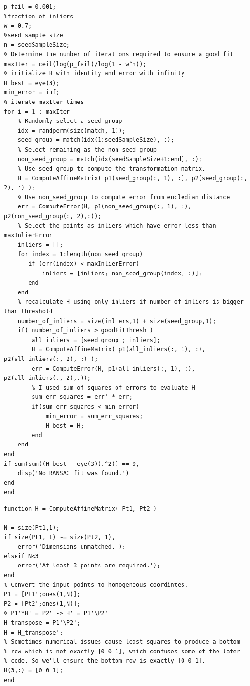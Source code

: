 \documentclass{article}
\begin{document}
\begin{lstlisting}[caption={My implementation of RANSACFit function.},captionpos=b]
%probability that all samples fail
p_fail = 0.001;
%fraction of inliers
w = 0.7;
%seed sample size
n = seedSampleSize;
% Determine the number of iterations required to ensure a good fit
maxIter = ceil(log(p_fail)/log(1 - w^n));
% initialize H with identity and error with infinity
H_best = eye(3);
min_error = inf;
% iterate maxIter times
for i = 1 : maxIter
    % Randomly select a seed group
    idx = randperm(size(match, 1));
    seed_group = match(idx(1:seedSampleSize), :);
    % Select remaining as the non-seed group
    non_seed_group = match(idx(seedSampleSize+1:end), :);
    % Use seed_group to compute the transformation matrix.
    H = ComputeAffineMatrix( p1(seed_group(:, 1), :), p2(seed_group(:, 2), :) );
    % Use non_seed_group to compute error from eucledian distance
    err = ComputeError(H, p1(non_seed_group(:, 1), :), p2(non_seed_group(:, 2),:));
    % Select the points as inliers which have error less than maxInlierError
    inliers = [];
    for index = 1:length(non_seed_group)
       if (err(index) < maxInlierError)
           inliers = [inliers; non_seed_group(index, :)];
       end
    end
    % recalculate H using only inliers if number of inliers is bigger than threshold
    number_of_inliers = size(inliers,1) + size(seed_group,1);
    if( number_of_inliers > goodFitThresh )
        all_inliers = [seed_group ; inliers];
        H = ComputeAffineMatrix( p1(all_inliers(:, 1), :), p2(all_inliers(:, 2), :) );
        err = ComputeError(H, p1(all_inliers(:, 1), :), p2(all_inliers(:, 2),:));
        % I used sum of squares of errors to evaluate H
        sum_err_squares = err' * err;
        if(sum_err_squares < min_error)
            min_error = sum_err_squares;
            H_best = H;
        end
    end
end
if sum(sum((H_best - eye(3)).^2)) == 0,
    disp('No RANSAC fit was found.')
end
end
\end{lstlisting}

\begin{lstlisting}[caption={My implementation of ComputeAffineMatrix function.},captionpos=b]
function H = ComputeAffineMatrix( Pt1, Pt2 )

N = size(Pt1,1);
if size(Pt1, 1) ~= size(Pt2, 1),
    error('Dimensions unmatched.');
elseif N<3
    error('At least 3 points are required.');
end
% Convert the input points to homogeneous coordintes.
P1 = [Pt1';ones(1,N)];
P2 = [Pt2';ones(1,N)];
% P1'*H' = P2' -> H' = P1'\P2'
H_transpose = P1'\P2';
H = H_transpose';
% Sometimes numerical issues cause least-squares to produce a bottom
% row which is not exactly [0 0 1], which confuses some of the later
% code. So we'll ensure the bottom row is exactly [0 0 1].
H(3,:) = [0 0 1];
end
\end{lstlisting}
\end{document}
